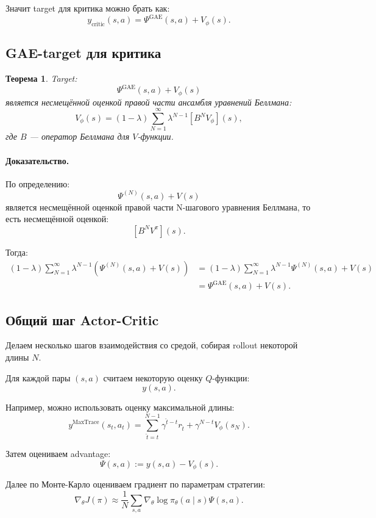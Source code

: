 \documentclass[12pt,a4paper]{article}
\newtheorem{theorem}{Теорема}
\begin{document}
Значит target для критика можно брать как:
\[
y_{\mathrm{critic}}(s,a)
=
\Psi^{\mathrm{GAE}}(s,a)
+
V_\phi(s).
\]

\subsection{GAE-target для критика}

\begin{theorem}
Target:
\[
\Psi^{\mathrm{GAE}}(s,a)
+
V_\phi(s)
\]
является несмещённой оценкой правой части ансамбля уравнений Беллмана:
\[
V_\phi(s)
=
(1-\lambda)
\sum_{N=1}^{\infty}
\lambda^{N-1}
\left[
B^N V_\phi
\right](s),
\]
где $B$ --- оператор Беллмана для $V$-функции.
\end{theorem}

\paragraph{Доказательство.}

По определению:
\[
\Psi^{(N)}(s,a)+V(s)
\]
является несмещённой оценкой правой части N-шагового уравнения Беллмана, то есть несмещённой оценкой:
\[
\left[
B^N V^\pi
\right](s).
\]

Тогда:
\[
\begin{aligned}
(1-\lambda)
\sum_{N=1}^{\infty}
\lambda^{N-1}
\left(
\Psi^{(N)}(s,a)+V(s)
\right)
&=
(1-\lambda)
\sum_{N=1}^{\infty}
\lambda^{N-1}
\Psi^{(N)}(s,a)
+
V(s)
\\
&=
\Psi^{\mathrm{GAE}}(s,a)
+
V(s).
\end{aligned}
\]

\subsection{Общий шаг Actor-Critic}

Делаем несколько шагов взаимодействия со средой, собирая rollout некоторой длины $N$.

Для каждой пары $(s,a)$ считаем некоторую оценку $Q$-функции:
\[
y(s,a).
\]

Например, можно использовать оценку максимальной длины:
\[
y^{\mathrm{MaxTrace}}(s_t,a_t)
=
\sum_{\hat t=t}^{N-1}
\gamma^{\hat t-t}
r_{\hat t}
+
\gamma^{N-t}
V_\phi(s_N).
\]

Затем оцениваем advantage:
\[
\Psi(s,a)
:=
y(s,a)
-
V_\phi(s).
\]

Далее по Монте-Карло оцениваем градиент по параметрам стратегии:
\[
\nabla_\theta J(\pi)
\approx
\frac{1}{N}
\sum_{s,a}
\nabla_\theta
\log \pi_\theta(a\mid s)
\Psi(s,a).
\]
\end{document}
